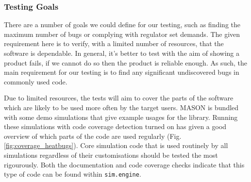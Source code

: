 \documentclass[11pt]{article}
\begin{document}




\subsubsection{Testing Goals}

There are a number of goals we could define for our testing, such as finding the maximum number of bugs or complying with regulator set demands.
The given requirement here is to verify, with a limited number of resources, that the software is dependable.
In general, it's better to test with the aim of showing a product fails, if we cannot do so then the product is reliable enough\cite[pp. 20]{lessons_book}.
As such, the main requirement for our testing is to find any significant undiscovered bugs in commonly used code.


Due to limited resources, the tests will aim to cover the parts of the software which are likely to be used more often by the target users.
MASON is bundled with some demo simulations that give example usages for the library.
Running these simulations with code coverage detection turned on has given a good overview of which parts of the code are used regularly (Fig. \ref{fig:coverage_heatbugs}).
Core simulation code that is used routinely by all simulations regardless of their customisations should be tested the most rigourously.
Both the documentation and code coverage checks indicate that this type of code can be found within \texttt{sim.engine}.
\end{document}
